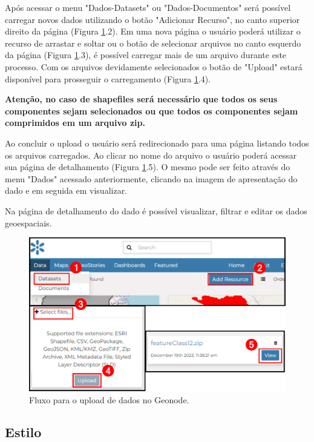 \documentclass[12pt]{article}
\begin{document}
Após acessar o menu "Dados-Datasets" ou "Dados-Documentos" será possível
carregar novos dados utilizando o botão "Adicionar Recurso", no canto superior
direito da página (Figura \ref{fig:upload}.2). Em uma nova página o usuário
poderá utilizar o recurso de arrastar e soltar ou o botão de selecionar
arquivos no canto esquerdo da página (Figura \ref{fig:upload}.3), é possível
carregar mais de um arquivo durante este processo. Com os arquivos devidamente
selecionados o botão de "Upload" estará disponível para prosseguir o
carregamento (Figura \ref{fig:upload}.4). 

\textbf{Atenção, no caso de shapefiles será necessário que todos os seus
componentes sejam selecionados ou que todos os componentes sejam comprimidos em
um arquivo zip.}

Ao concluir o upload o usuário será redirecionado para uma página listando
todos os arquivos carregados. Ao clicar no nome do arquivo o usuário poderá
acessar sua página de detalhamento (Figura \ref{fig:upload}.5). O mesmo pode
ser feito através do menu "Dados" acessado anteriormente, clicando na imagem de
apresentação do dado e em seguida em visualizar.

Na página de detalhamento do dado é possível visualizar, filtrar e editar os
dados geoespaciais.

\begin{figure}[ht]
  \centering
  \includegraphics[width=\textwidth, keepaspectratio]{img/upload.pdf}
  \caption{Fluxo para o upload de dados no Geonode.}
  \label{fig:upload}
\end{figure}

\subsection{Estilo}
\end{document}
